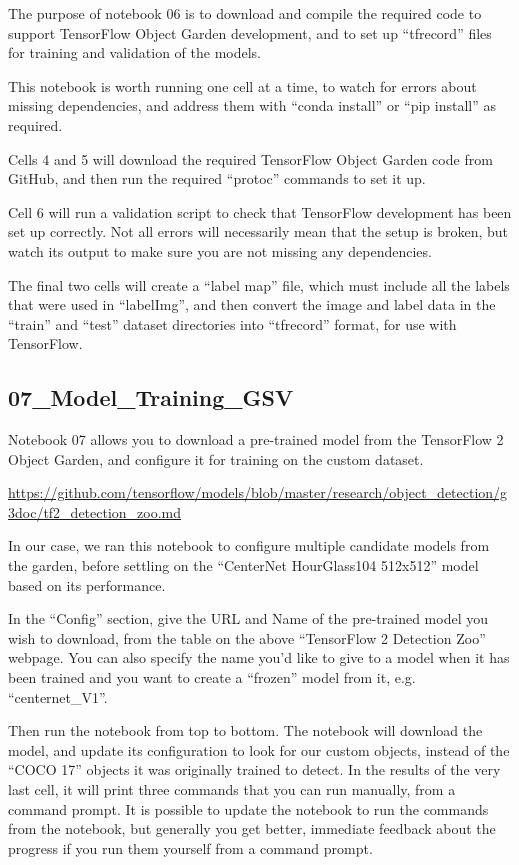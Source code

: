 \documentclass[11pt,twoside]{report}
\begin{document}
The purpose of notebook 06 is to download and compile the required code to support TensorFlow Object Garden development, and to set up ``tfrecord'' files for training and validation of the models.

This notebook is worth running one cell at a time, to watch for errors about missing dependencies, and address them with ``conda install'' or ``pip install'' as required.

Cells 4 and 5 will download the required TensorFlow Object Garden code from GitHub, and then run the required ``protoc'' commands to set it up.

Cell 6 will run a validation script to check that TensorFlow development has been set up correctly.  Not all errors will necessarily mean that the setup is broken, but watch its output to make sure you are not missing any dependencies.

The final two cells will create a ``label map'' file, which must include all the labels that were used in ``labelImg'', and then convert the image and label data in the ``train'' and ``test'' dataset directories into ``tfrecord'' format, for use with TensorFlow.


\subsection{07\_Model\_Training\_GSV}

Notebook 07 allows you to download a pre-trained model from the TensorFlow 2 Object Garden, and configure it for training on the custom dataset.

\url{https://github.com/tensorflow/models/blob/master/research/object_detection/g3doc/tf2_detection_zoo.md}

In our case, we ran this notebook to configure multiple candidate models from the garden, before settling on the ``CenterNet HourGlass104 512x512'' model based on its performance.

In the ``Config'' section, give the URL and Name of the pre-trained model you wish to download, from the table on the above ``TensorFlow 2 Detection Zoo'' webpage.  You can also specify the name you'd like to give to a model when it has been trained and you want to create a ``frozen'' model from it, e.g. ``centernet\_V1''.

Then run the notebook from top to bottom.  The notebook will download the model, and update its configuration to look for our custom objects, instead of the ``COCO 17'' objects it was originally trained to detect.  In the results of the very last cell, it will print three commands that you can run manually, from a command prompt.  It is possible to update the notebook to run the commands from the notebook, but generally you get better, immediate feedback about the progress if you run them yourself from a command prompt.
\end{document}
